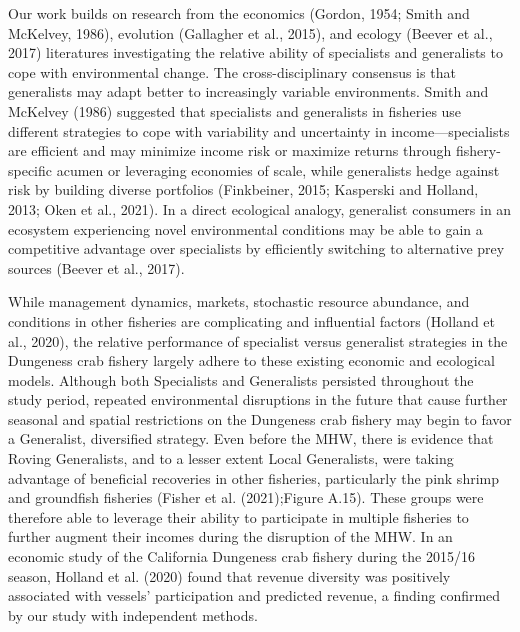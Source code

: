 \documentclass[]{elsarticle} %
\begin{document}
Our work builds on research from the economics (Gordon, 1954; Smith and
McKelvey, 1986), evolution (Gallagher et al., 2015), and ecology (Beever
et al., 2017) literatures investigating the relative ability of
specialists and generalists to cope with environmental change. The
cross-disciplinary consensus is that generalists may adapt better to
increasingly variable environments. Smith and McKelvey (1986) suggested
that specialists and generalists in fisheries use different strategies
to cope with variability and uncertainty in income---specialists are
efficient and may minimize income risk or maximize returns through
fishery-specific acumen or leveraging economies of scale, while
generalists hedge against risk by building diverse portfolios
(Finkbeiner, 2015; Kasperski and Holland, 2013; Oken et al., 2021). In a
direct ecological analogy, generalist consumers in an ecosystem
experiencing novel environmental conditions may be able to gain a
competitive advantage over specialists by efficiently switching to
alternative prey sources (Beever et al., 2017).

While management dynamics, markets, stochastic resource abundance, and
conditions in other fisheries are complicating and influential factors
(Holland et al., 2020), the relative performance of specialist versus
generalist strategies in the Dungeness crab fishery largely adhere to
these existing economic and ecological models. Although both Specialists
and Generalists persisted throughout the study period, repeated
environmental disruptions in the future that cause further seasonal and
spatial restrictions on the Dungeness crab fishery may begin to favor a
Generalist, diversified strategy. Even before the MHW, there is evidence
that Roving Generalists, and to a lesser extent Local Generalists, were
taking advantage of beneficial recoveries in other fisheries,
particularly the pink shrimp and groundfish fisheries (Fisher et al.
(2021);Figure A.15). These groups were therefore able to leverage their
ability to participate in multiple fisheries to further augment their
incomes during the disruption of the MHW. In an economic study of the
California Dungeness crab fishery during the 2015/16 season, Holland et
al. (2020) found that revenue diversity was positively associated with
vessels' participation and predicted revenue, a finding confirmed by our
study with independent methods.
\end{document}
